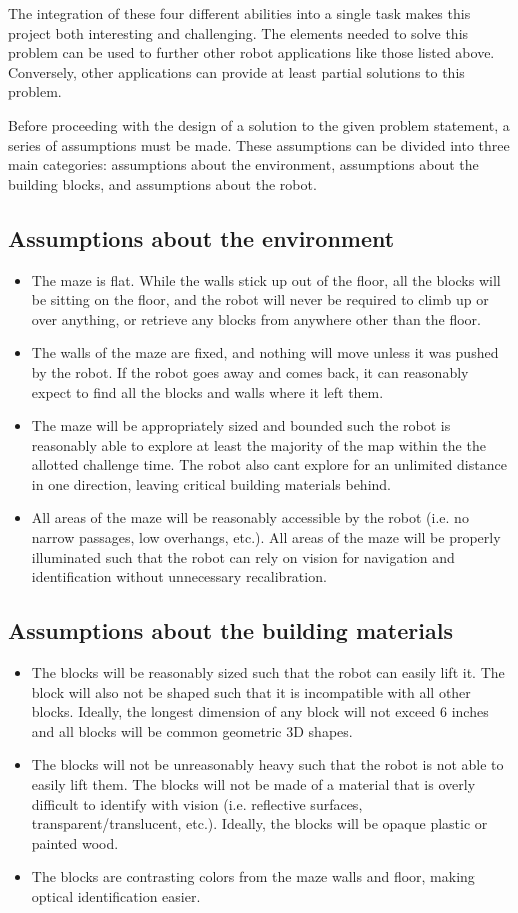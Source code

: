 \documentclass[letterpaper,11pt]{article}
\begin{document}
The integration of these four different abilities into a single task makes this project both interesting and challenging.  The elements needed to solve this problem can be used to further other robot applications like those listed above.  Conversely, other applications can provide at least partial solutions to this problem. 

Before proceeding with the design of a solution to the given problem statement, a series of assumptions must be made.  These assumptions can be divided into three main categories: assumptions about the environment, assumptions about the building blocks, and assumptions about the robot.

\subsection{Assumptions about the environment}
\begin{itemize}
 \item The maze is flat. While the walls stick up out of the floor, all the blocks will be sitting on the floor, and the robot will never be required to climb up or over anything, or retrieve any blocks from anywhere other than the floor.
 \item The walls of the maze are fixed, and nothing will move unless it was pushed by the robot. If the robot goes away and comes back, it can reasonably expect to find all the blocks and walls where it left them.
 \item The maze will be appropriately sized and bounded such the robot is reasonably able to explore at least the majority of the map within the the allotted challenge time. The robot also cant explore for an unlimited distance in one direction, leaving critical building materials behind.
 \item All areas of the maze will be reasonably accessible by the robot (i.e. no narrow passages, low overhangs, etc.).  All areas of the maze will be properly illuminated such that the robot can rely on vision for navigation and identification without unnecessary recalibration.
\end{itemize}
\subsection{Assumptions about the building materials}
\begin{itemize}
 \item The blocks will be reasonably sized such that the robot can easily lift it.  The block will also not be shaped such that it is incompatible with all other blocks. Ideally, the longest dimension of any block will not exceed 6 inches and all blocks will be common geometric 3D shapes.
 \item The blocks will not be unreasonably heavy such that the robot is not able to easily lift them.  The blocks will not be made of a material that is overly difficult to identify with vision (i.e. reflective surfaces, transparent/translucent, etc.).  Ideally, the blocks will be opaque plastic or painted wood.
 \item The blocks are contrasting colors from the maze walls and floor, making optical identification easier.
\end{itemize}
\end{document}
